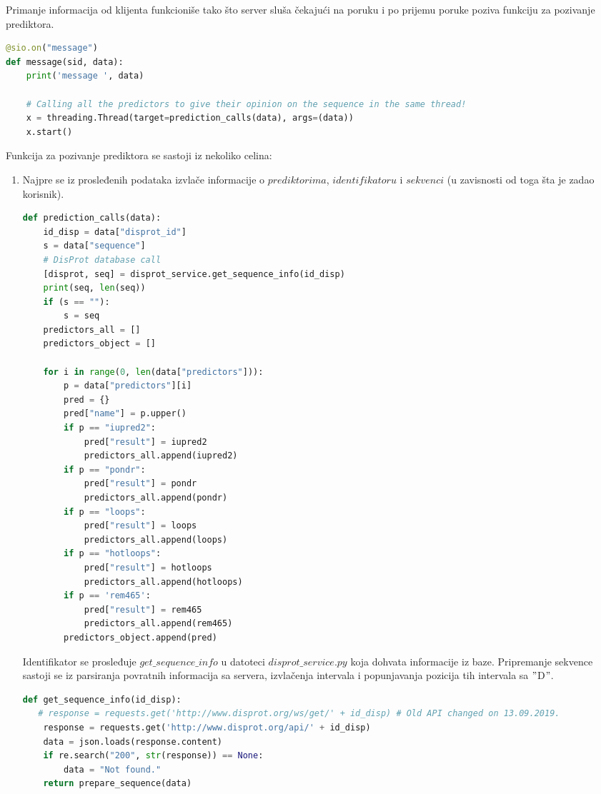 Primanje informacija od klijenta funkcioniše tako što server sluša čekajući na poruku i po prijemu poruke poziva funkciju za pozivanje prediktora.
\begin{lstlisting}[language=Python]
@sio.on("message")
def message(sid, data):
    print('message ', data)
    
    # Calling all the predictors to give their opinion on the sequence in the same thread!
    x = threading.Thread(target=prediction_calls(data), args=(data))
    x.start()
\end{lstlisting}

Funkcija za pozivanje prediktora se sastoji iz nekoliko celina:
\begin{enumerate}
\item Najpre se iz prosleđenih podataka izvlače informacije o $prediktorima$, $identifikatoru$ i $sekvenci$ (u zavisnosti od toga šta je zadao korisnik). 
\begin{lstlisting}[language=Python]
def prediction_calls(data):
    id_disp = data["disprot_id"]
    s = data["sequence"]
    # DisProt database call
    [disprot, seq] = disprot_service.get_sequence_info(id_disp)
    print(seq, len(seq))
    if (s == ""):
        s = seq
	predictors_all = []
	predictors_object = []
    
	for i in range(0, len(data["predictors"])):
        p = data["predictors"][i]
        pred = {}
        pred["name"] = p.upper()
        if p == "iupred2":
            pred["result"] = iupred2
            predictors_all.append(iupred2) 
        if p == "pondr":
            pred["result"] = pondr
            predictors_all.append(pondr)   
        if p == "loops":
            pred["result"] = loops
            predictors_all.append(loops)
        if p == "hotloops":
            pred["result"] = hotloops
            predictors_all.append(hotloops)  
        if p == 'rem465':
            pred["result"] = rem465
            predictors_all.append(rem465)
        predictors_object.append(pred)
\end{lstlisting}
Identifikator se prosleđuje $get\_sequence\_info$ u datoteci $disprot\_service.py$ koja dohvata informacije iz baze. Pripremanje sekvence sastoji se iz parsiranja povratnih informacija sa servera, izvlačenja intervala i popunjavanja pozicija tih intervala sa $"$D$"$.
\begin{lstlisting}[language=Python]
def get_sequence_info(id_disp):
   # response = requests.get('http://www.disprot.org/ws/get/' + id_disp) # Old API changed on 13.09.2019.
    response = requests.get('http://www.disprot.org/api/' + id_disp)
    data = json.loads(response.content)
    if re.search("200", str(response)) == None:
        data = "Not found."
    return prepare_sequence(data)
    

\end{lstlisting}
\end{enumerate}
